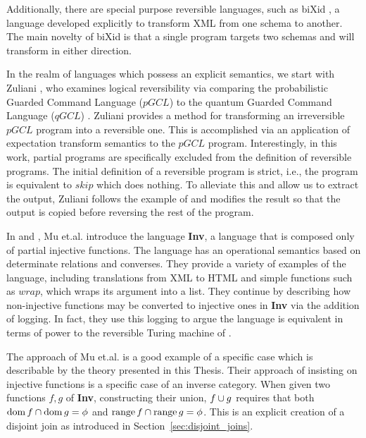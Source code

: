 Additionally, there are special purpose reversible languages, such as biXid \cite{bixid06}, a
language developed explicitly to transform XML \cite{xml} from one schema to another. The main
novelty of biXid is that a single program targets two schemas and will transform in either direction.

In the realm of languages which possess an explicit semantics, we start with Zuliani
\cite{zuliani01:reversibility}, who examines logical reversibility via comparing the probabilistic
Guarded Command Language ($pGCL$) \cite{MorganIver99} to the quantum Guarded Command Language
($qGCL$) \cite{sanders:quantum}. Zuliani provides a method for transforming an irreversible $pGCL$
program into a reversible one. This is accomplished via an application of expectation transform
semantics to the $pGCL$ program. Interestingly, in this work, partial programs are specifically
excluded from the definition of reversible programs. The initial definition of a reversible program
is strict, i.e., the program is equivalent to $skip$ which does nothing. To alleviate this and allow
us to extract the output, Zuliani follows the example of \cite{bennett:1973reverse} and modifies the
result so that the output is copied before reversing the rest of the program.

In \cite{mu06bidirectional} and \cite{muetal04:injreversible}, Mu et.al. introduce the language
\textbf{Inv}, a language that is composed only of partial injective functions. The language has an
operational semantics based on determinate relations and converses. They provide a variety of examples of the
language, including translations from XML to HTML and simple functions such as $wrap$, which wraps
its argument into a list. They continue by describing how non-injective functions may be converted to
injective ones in \textbf{Inv} via the addition of logging. In fact, they use this logging to argue
the language is equivalent in terms of power to the reversible Turing machine of
\cite{bennett:1973reverse}.

The approach of Mu et.al. is a good example of a specific case which is describable by the theory
presented in this Thesis. Their approach of insisting on injective functions is a specific case of
an inverse category. When given two functions $f,g$ of \textbf{Inv}, constructing their union,
$f\cup g$ requires that both $\operatorname*{dom} f \cap \operatorname*{dom} g = \phi$ and $\operatorname*{range} f \cap \operatorname*{range} g =
\phi$. This is an explicit creation of a disjoint join as introduced in
Section~\ref{sec:disjoint_joins}.

